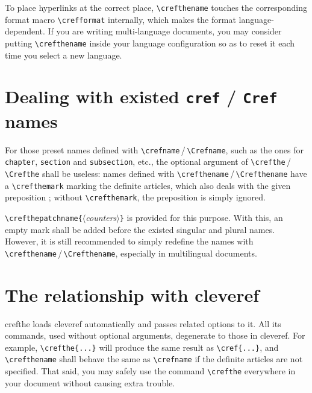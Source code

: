 \documentclass[classical]{einfart}
\newcommand{\meta}[1]{$\langle${\normalfont\itshape#1}$\rangle$}
\newcommand{\crefthepackage}{\textsf{crefthe}}
\begin{document}
To place hyperlinks at the correct place, \lstinline|\crefthename| touches the corresponding format macro \lstinline|\crefformat| internally, which makes the format language-dependent. If you are writing multi-language documents, you may consider putting \lstinline|\crefthename| inside your language configuration so as to reset it each time you select a new language.

\section{Dealing with existed \texttt{cref} / \texttt{Cref} names}

For those preset names defined with \lstinline|\crefname|\,/\,\lstinline|\Crefname|, such as the ones for \texttt{chapter}, \texttt{section} and \texttt{subsection}, etc., the optional argument of \lstinline|\crefthe|\,/\,\lstinline|\Crefthe| shall be useless: names defined with \lstinline|\crefthename|\,/\,\lstinline|\Crefthename| have a \lstinline|\crefthemark| marking the definite articles, which also deals with the given preposition ; without \lstinline|\crefthemark|, the preposition is simply ignored.

\lstinline|\crefthepatchname{|\meta{counters}\lstinline|}| is provided for this purpose. With this, an empty mark shall be added before the existed singular and plural names. However, it is still recommended to simply redefine the names with \lstinline|\crefthename|\,/\,\lstinline|\Crefthename|, especially in multilingual documents.



\section{The relationship with \textsf{cleveref}}

\crefthepackage{} loads \textsf{cleveref} automatically and passes related options to it. All its commands, used without optional arguments, degenerate to those in \textsf{cleveref}. For example, \lstinline|\crefthe{...}|%
will produce the same result as \lstinline|\cref{...}|, and \lstinline|\crefthename| shall behave the same as \lstinline|\crefname| if the definite articles are not specified. That said, you may safely use the command \lstinline|\crefthe| everywhere in your document without causing extra trouble.
\end{document}
